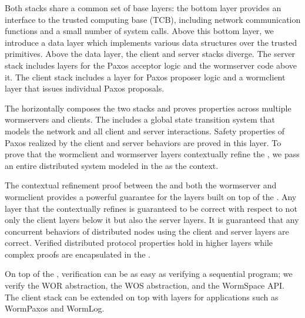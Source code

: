 Both stacks share a common set of base layers: the bottom layer provides an interface to the trusted computing base (TCB), including network communication functions and a small number of system calls. Above this bottom layer, we introduce a data layer which implements various data structures over the trusted primitives. Above the data layer, the client and server stacks diverge. The server stack includes layers for the Paxos acceptor logic and the wormserver code above it. The client stack includes a layer for Paxos proposer logic and a wormclient layer that issues individual Paxos proposals.

The \ghostlayer{} horizontally composes the two stacks and proves properties across multiple wormservers and clients. The \ghostlayer{} includes a global state transition system that models the network and all client and server interactions. Safety properties of Paxos realized by the client and server behaviors are proved in this layer. To prove that the wormclient and wormserver layers contextually refine the \ghostlayer{}, we pass an entire distributed system modeled in the \ghostlayer{} as the context.

The contextual refinement proof between the \ghostlayer{} and both the wormserver and wormclient provides a powerful guarantee for the layers built on top of the \ghostlayer{}. Any layer that the \ghostlayer{} contextually refines is guaranteed to be correct with respect to not only the client layers below it but also the server layers. It is guaranteed that any concurrent behaviors of distributed nodes using the client and server layers are correct. Verified distributed protocol properties hold in higher layers while complex proofs are encapsulated in the \ghostlayer{}.

On top of the \ghostlayer{}, verification can be as easy as verifying a sequential program; we verify the WOR abstraction, the WOS abstraction, and the WormSpace API.
The client stack can be extended on top with layers for applications such as WormPaxos and WormLog.



